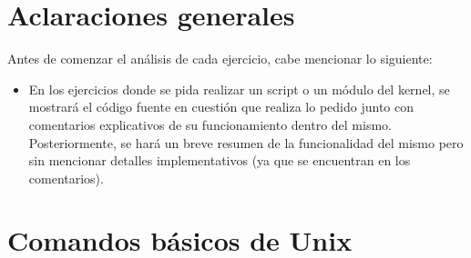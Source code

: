 \documentclass[a4paper,11pt] {article}
\begin{document}

\maketitle

\bigskip
\section*{Aclaraciones generales}

Antes de comenzar el an\'alisis de cada ejercicio, cabe mencionar lo siguiente: 

\begin{itemize}
 \item En los ejercicios donde se pida realizar un script o un módulo del kernel, se mostrará el código fuente en cuestión que realiza lo pedido junto con comentarios explicativos de su funcionamiento dentro del mismo. Posteriormente, se hará un breve resumen de la funcionalidad del mismo pero sin mencionar detalles implementativos (ya que se encuentran en los comentarios).
\end{itemize}

\section{Comandos b\'asicos de Unix}
\end{document}
